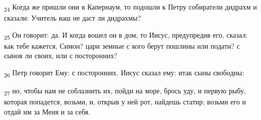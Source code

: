 \begin{tcolorbox}
\textsubscript{24} Когда же пришли они в Капернаум, то подошли к Петру собиратели дидрахм и сказали: Учитель ваш не даст ли дидрахмы?
\end{tcolorbox}
\begin{tcolorbox}
\textsubscript{25} Он говорит: да. И когда вошел он в дом, то Иисус, предупредив его, сказал: как тебе кажется, Симон? цари земные с кого берут пошлины или подати? с сынов ли своих, или с посторонних?
\end{tcolorbox}
\begin{tcolorbox}
\textsubscript{26} Петр говорит Ему: с посторонних. Иисус сказал ему: итак сыны свободны;
\end{tcolorbox}
\begin{tcolorbox}
\textsubscript{27} но, чтобы нам не соблазнить их, пойди на море, брось уду, и первую рыбу, которая попадется, возьми, и, открыв у ней рот, найдешь статир; возьми его и отдай им за Меня и за себя.
\end{tcolorbox}
